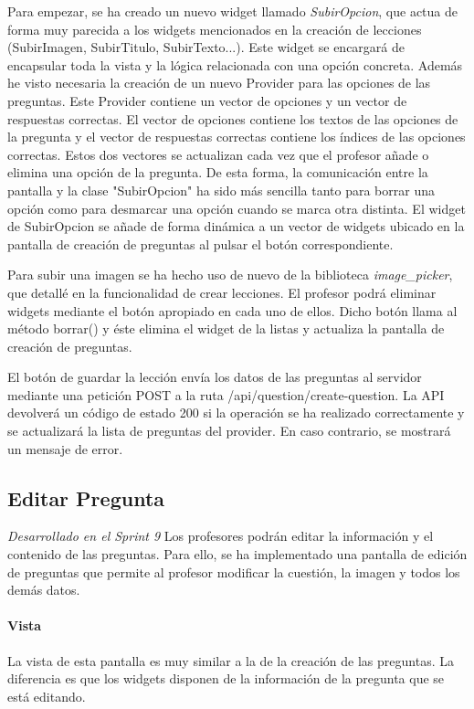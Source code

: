 Para empezar, se ha creado un nuevo widget llamado \textit{SubirOpcion}, que actua de forma muy parecida a los widgets mencionados en la creación de lecciones (SubirImagen, SubirTitulo, SubirTexto...). Este widget se encargará de encapsular toda la vista y la lógica relacionada con una opción concreta.
Además he visto necesaria la creación de un nuevo Provider para las opciones de las preguntas. Este Provider contiene un vector de opciones y un vector de respuestas correctas.
El vector de opciones contiene los textos de las opciones de la pregunta y el vector de respuestas correctas contiene los índices de las opciones correctas.
Estos dos vectores se actualizan cada vez que el profesor añade o elimina una opción de la pregunta. De esta forma, la comunicación entre la pantalla y la clase "SubirOpcion" ha sido más sencilla tanto para borrar una opción como para desmarcar una opción cuando se marca otra distinta.
El widget de SubirOpcion se añade de forma dinámica a un vector de widgets ubicado en la pantalla de creación de preguntas al pulsar el botón correspondiente.


Para subir una imagen se ha hecho uso de nuevo de la biblioteca \textit{image\_picker}, que detallé en la funcionalidad de crear lecciones.
El profesor podrá eliminar widgets mediante el botón apropiado en cada uno de ellos. Dicho botón llama al método borrar() y éste elimina el widget de la listas y actualiza la pantalla de creación de preguntas.

El botón de guardar la lección envía los datos de las preguntas al servidor mediante una petición POST a la ruta /api/question/create-question. La API devolverá un código de estado 200 si la operación se ha realizado correctamente y se actualizará la lista de preguntas del provider. En caso contrario, se mostrará un mensaje de error.

\newpage

\subsection{Editar Pregunta} 

\textit{Desarrollado en el Sprint 9}
Los profesores podrán editar la información y el contenido de las preguntas. Para ello, se ha implementado una pantalla de edición de preguntas que permite al profesor modificar la cuestión, la imagen y todos los demás datos.

\paragraph*{Vista}
La vista de esta pantalla es muy similar a la de la creación de las preguntas. La diferencia es que los widgets disponen de la información de la pregunta que se está editando.


